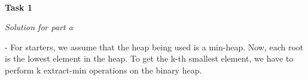 \documentclass[11pt]{article}
\begin{document}
{\Large
\begin{center}

{}~\\
\vspace{0.25cm}
\end{center}
}

\medskip

\medskip

{\bf Task 1}

\textit{Solution for part a}

\medskip

- For starters, we assume that the heap being used is a min-heap. Now, each root is the lowest element in the heap. To get the k-th smallest element, we have to perform k extract-min operations on the binary heap. 
\end{document}
